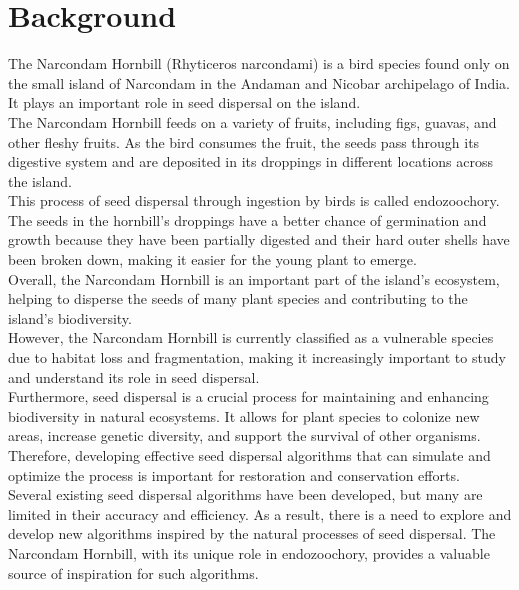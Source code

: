 \documentclass[pmlr,twocolumn,10pt]{jmlr}
\begin{document}
\section*{Background}
The Narcondam Hornbill (Rhyticeros narcondami) is a bird species found only on the small island of Narcondam in the Andaman and Nicobar archipelago of India. It plays an important role in seed dispersal on the island.
\\The Narcondam Hornbill feeds on a variety of fruits, including figs, guavas, and other fleshy fruits. As the bird consumes the fruit, the seeds pass through its digestive system and are deposited in its droppings in different locations across the island.
\\This process of seed dispersal through ingestion by birds is called endozoochory. The seeds in the hornbill's droppings have a better chance of germination and growth because they have been partially digested and their hard outer shells have been broken down, making it easier for the young plant to emerge.
\\Overall, the Narcondam Hornbill is an important part of the island's ecosystem, helping to disperse the seeds of many plant species and contributing to the island's biodiversity.
\\However, the Narcondam Hornbill is currently classified as a vulnerable species due to habitat loss and fragmentation, making it increasingly important to study and understand its role in seed dispersal.
\\Furthermore, seed dispersal is a crucial process for maintaining and enhancing biodiversity in natural ecosystems. It allows for plant species to colonize new areas, increase genetic diversity, and support the survival of other organisms. Therefore, developing effective seed dispersal algorithms that can simulate and optimize the process is important for restoration and conservation efforts.
\\Several existing seed dispersal algorithms have been developed, but many are limited in their accuracy and efficiency. As a result, there is a need to explore and develop new algorithms inspired by the natural processes of seed dispersal. The Narcondam Hornbill, with its unique role in endozoochory, provides a valuable source of inspiration for such algorithms.
\end{document}
